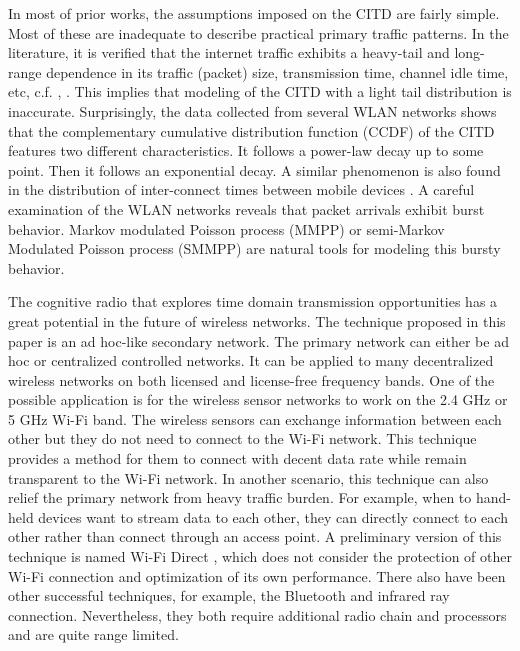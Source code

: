 \documentclass[10pt,final,journal,letterpaper]{IEEEtran}
\begin{document}
\par
In most of prior works, the assumptions imposed on the CITD are fairly simple. Most of these are inadequate to describe practical primary traffic patterns. In the literature, it is verified that the internet traffic exhibits a heavy-tail and long-range dependence in its traffic (packet) size, transmission time, channel idle time, etc, c.f. \cite{crovella1998heavy}, \cite{paxson1995wide}. This implies that modeling of the CITD with a light tail distribution is inaccurate. Surprisingly, the data collected from several WLAN networks shows that the complementary cumulative distribution function (CCDF) of the CITD features two different characteristics. It follows a power-law decay up to some point. Then it follows an exponential decay. A similar phenomenon is also found in the distribution of inter-connect times between mobile devices \cite{karagiannis2010power}. A careful examination of the WLAN networks reveals that packet arrivals exhibit burst behavior. Markov modulated Poisson process (MMPP) \cite{heffes1986markov} or semi-Markov Modulated Poisson process (SMMPP) are natural tools for modeling this bursty behavior.

\par
The cognitive radio that explores time domain transmission opportunities has a great potential in the future of wireless networks. The technique proposed in this paper is an ad hoc-like secondary network. The primary network can either be ad hoc or centralized controlled networks. It can be applied to many decentralized wireless networks on both licensed and license-free frequency bands. One of the possible application is for the wireless sensor networks to work on the 2.4 GHz or 5 GHz Wi-Fi band. The wireless sensors can exchange information between each other but they do not need to connect to the Wi-Fi network. This technique provides a method for them to connect with decent data rate while remain transparent to the Wi-Fi network. In another scenario, this technique can also relief the primary network from heavy traffic burden. For example, when to hand-held devices want to stream data to each other, they can directly connect to each other rather than connect through an access point. A preliminary version of this technique is named Wi-Fi Direct \cite{alliance2010wi}, which does not consider the protection of other Wi-Fi connection and optimization of its own performance. There also have been other successful techniques, for example, the Bluetooth and infrared ray connection. Nevertheless, they both require additional radio chain and processors and are quite range limited.
\end{document}
